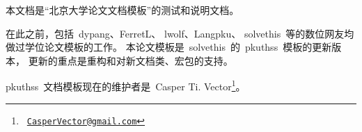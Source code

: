 
本文档是“北京大学论文文档模板”的测试和说明文档。

在此之前，包括~dypang\supercite{dypang}、FerretL\supercite{FerretL}、%
lwolf\supercite{lwolf}、Langpku\supercite{Langpku}、%
solvethis\supercite{solvethis}~等的数位网友均做过学位论文模板的工作。
本论文模板是~solvethis~的~pkuthss~模板的更新版本，
更新的重点是重构和对新文档类、宏包的支持。

pkuthss~文档模板现在的维护者是~Casper Ti. Vector\footnote%
{\ \href{CasperVector@gmail.com}{\texttt{CasperVector@gmail.com}}}。

